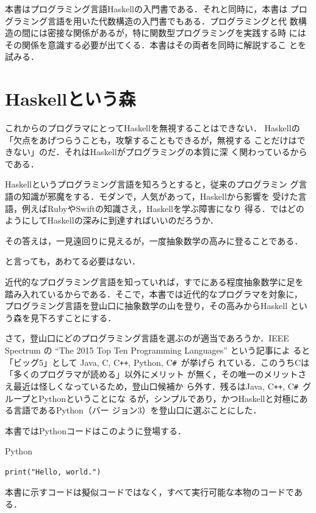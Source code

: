 \documentclass[a5paper,twoside,fleqn,draft]{jsbook}
\newcommand{\programminglanguage}[1]{\textsf{#1}}
\newcommand{\clang}{\programminglanguage{C}}
\newcommand{\csharp}{\programminglanguage{C}\texttt{\#}}
\newcommand{\cxx}{\programminglanguage{C}\texttt{++}}
\newcommand{\haskell}{\programminglanguage{Haskell}}
\newcommand{\java}{\programminglanguage{Java}}
\newcommand{\python}{\programminglanguage{Python}}
\newcommand{\ruby}{\programminglanguage{Ruby}}
\newcommand{\swift}{\programminglanguage{Swift}}
\newenvironment{leader}{\begingroup\gt}{\endgroup}
\newenvironment{pythoncode}{\begin{itembox}[r]{\python}}{\end{itembox}}
\begin{document}
\begin{leader}
本書はプログラミング言語\haskell の入門書である．それと同時に，本書は
プログラミング言語を用いた代数構造の入門書でもある．プログラミングと代
数構造の間には密接な関係があるが，特に関数型プログラミングを実践する時
にはその関係を意識する必要が出てくる．本書はその両者を同時に解説するこ
とを試みる．
\end{leader}

\section{\haskell という森}

これからのプログラマにとって\haskell を無視することはできない．
\haskell の「欠点をあげつらうことも，攻撃することもできるが，無視する
  ことだけはできない」のだ．それは\haskell がプログラミングの本質に深
く関わっているからである．

\haskell というプログラミング言語を知ろうとすると，従来のプログラミン
グ言語の知識が邪魔をする．モダンで，人気があって，\haskell から影響を
受けた言語，例えば\ruby や\swift の知識さえ，\haskell を学ぶ障害になり
得る．ではどのようにして\haskell の深みに到達すればいいのだろうか．

その答えは，一見遠回りに見えるが，一度抽象数学の高みに登ることである．

と言っても，あわてる必要はない．

近代的なプログラミング言語を知っていれば，すでにある程度抽象数学に足を
踏み入れているからである．そこで，本書では近代的なプログラマを対象に，
プログラミング言語を登山口に抽象数学の山を登り，その高みから\haskell
という森を見下ろすことにする．


さて，登山口にどのプログラミング言語を選ぶのが適当であろうか．IEEE
Spectrum の ``The 2015 Top Ten Programming Languages'' という記事によ
ると「ビッグ5」として \java, \clang, \cxx, \python, \csharp\ が挙げら
れている．このうち\clang は「多くのプログラマが読める」以外にメリット
が無く，その唯一のメリットさえ最近は怪しくなっているため，登山口候補か
ら外す．残るは\java, \cxx, \csharp\ グループと\python ということにな
るが，シンプルであり，かつ\haskell と対極にある言語である\python（バー
  ジョン3）を登山口に選ぶことにした．

本書では\python コードはこのように登場する．
\begin{pythoncode}
\begin{verbatim}
print("Hello, world.")
\end{verbatim}
\end{pythoncode}
本書に示すコードは擬似コードではなく，すべて実行可能な本物のコードであ
る．
\end{document}
